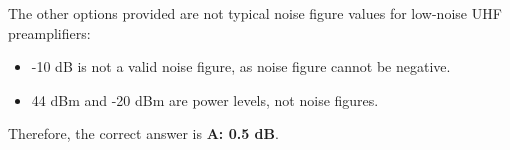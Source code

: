 The other options provided are not typical noise figure values for low-noise UHF preamplifiers:
\begin{itemize}
    \item -10 dB is not a valid noise figure, as noise figure cannot be negative.
    \item 44 dBm and -20 dBm are power levels, not noise figures.
\end{itemize}

Therefore, the correct answer is \textbf{A: 0.5 dB}.

